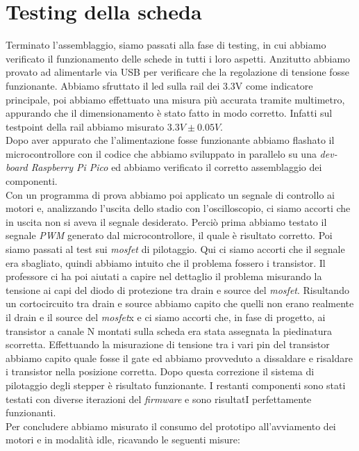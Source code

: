 \chapter{Testing della scheda}

Terminato l’assemblaggio, siamo passati alla fase di testing, in cui abbiamo verificato il funzionamento delle schede in tutti i loro aspetti.
Anzitutto abbiamo provato ad alimentarle via USB per verificare che la regolazione di tensione fosse funzionante. Abbiamo sfruttato il led sulla rail dei 3.3V come indicatore principale, poi abbiamo effettuato una misura più accurata tramite multimetro, appurando che il dimensionamento è stato fatto in modo corretto. Infatti sul testpoint della rail abbiamo misurato $3.3V \pm 0.05V$. \\
Dopo aver appurato che l’alimentazione fosse funzionante abbiamo flashato il microcontrollore con il codice che abbiamo sviluppato in parallelo su una \textit{dev-board Raspberry Pi Pico} ed abbiamo verificato il corretto assemblaggio dei componenti. \\
Con un programma di prova abbiamo poi applicato un segnale di controllo ai motori e, analizzando l’uscita dello stadio con l’oscilloscopio, ci siamo accorti che in uscita non si aveva il segnale desiderato. Perciò prima abbiamo testato il segnale \textit{PWM} generato dal microcontrollore, il quale è risultato corretto. Poi siamo passati al test sui \textit{mosfet} di pilotaggio. Qui ci siamo accorti che il segnale era sbagliato, quindi abbiamo intuito che il problema fossero i transistor. Il professore ci ha poi aiutati a capire nel dettaglio il problema misurando la tensione ai capi del diodo di protezione tra drain e source del \textit{mosfet}. Risultando un cortocircuito tra drain e source abbiamo capito che quelli non erano realmente il drain e il source del \textit{mosfet}x e ci siamo accorti che, in fase di progetto, ai transistor a canale N montati sulla scheda era stata assegnata la piedinatura scorretta. Effettuando la misurazione di tensione tra i vari pin del transistor abbiamo capito quale fosse il gate ed abbiamo provveduto a dissaldare e risaldare i transistor nella posizione corretta. Dopo questa correzione il sistema di pilotaggio degli stepper è risultato funzionante.
I restanti componenti sono stati testati con diverse iterazioni del \textit{firmware} e sono risultatI perfettamente funzionanti. \\
Per concludere abbiamo misurato il consumo del prototipo all’avviamento dei motori e in modalità idle,  ricavando le seguenti misure:


